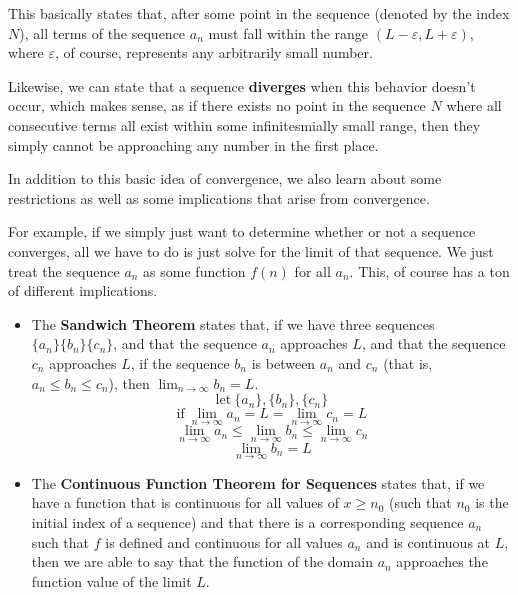 \documentclass{report}
\begin{document}
\begin{sloppypar}
This basically states that, after some point in the sequence (denoted by the index $ N $), all terms of the sequence $ a_{n}$ must
fall within the range $ ( L - \varepsilon, L + \varepsilon )$, where $ \varepsilon $, of course, represents any arbitrarily small number.
\par Likewise, we can state that a sequence \textbf{diverges} when this behavior doesn't occur, which makes sense, as if there
exists no point in the sequence $ N $ where all consecutive terms all exist within some infinitesmially small range, then they
simply cannot be approaching any number in the first place.
\par In addition to this basic idea of convergence, we also learn about some restrictions as well as some implications that
arise from convergence.
\par For example, if we simply just want to determine whether or not a sequence converges, all we have to do is just solve
for the limit of that sequence. We just treat the sequence $ a_{n} $ as some function $ f(n) $ for all $ a_{n} $. This, of course
has a ton of different implications.
\begin{itemize}
  \item The \textbf{Sandwich Theorem} states that, if we have three sequences $ \{ a_{n}\} \{b_{n}\} \{c_{n}\}$, and that the
        sequence $ a_{n} $ approaches $ L$, and that the sequence $ c_{n} $ approaches $ L $, if the sequence $ b_{n} $ is
        between $ a_{n}$ and $ c_{n}$ (that is, $ a_{n} \leq b_{n} \leq c_{n}$), then $ \lim_{n \rightarrow \infty} b_{n} = L $.
        \[ \textrm{let} ~ \{a_{n}\}, \{b_{n}\}, \{c_{n}\}\]
        \[ \textrm{if} ~ \lim_{n \rightarrow \infty}a_{n} = L = \lim_{n \rightarrow \infty}c_{n}=L\]
        \[ \lim_{n \rightarrow \infty} a_{n} \leq \lim_{n \rightarrow \infty} b_{n} \leq \lim_{n \rightarrow \infty} c_{n}\]
        \[ \lim_{n \rightarrow \infty} b_{n} = L \]
  \item The \textbf{Continuous Function Theorem for Sequences} states that, if we have a function that is continuous for
        all values of $ x \geq n_{0}$ (such that $ n_{0}$ is the initial index of a sequence) and that there is a corresponding
        sequence $ a_{n} $ such that $f $ is defined and continuous for all values $ a_{n}$ and is continuous at $ L $, then
        we are able to say that the function of the domain $ a_{n}$ approaches the function value of the limit $ L $.


\end{itemize}
\end{sloppypar}
\end{document}
